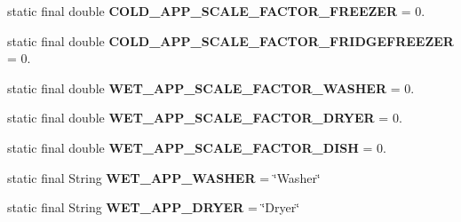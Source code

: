 \begin{DoxyCompactItemize}
\item 
\hypertarget{classuk_1_1ac_1_1dmu_1_1iesd_1_1cascade_1_1base_1_1_consts_a2bb906b11d1d16b15a14c3abafaad2d3}{static final double {\bfseries C\-O\-L\-D\-\_\-\-A\-P\-P\-\_\-\-S\-C\-A\-L\-E\-\_\-\-F\-A\-C\-T\-O\-R\-\_\-\-F\-R\-E\-E\-Z\-E\-R} = 0.}\label{classuk_1_1ac_1_1dmu_1_1iesd_1_1cascade_1_1base_1_1_consts_a2bb906b11d1d16b15a14c3abafaad2d3}

\item 
\hypertarget{classuk_1_1ac_1_1dmu_1_1iesd_1_1cascade_1_1base_1_1_consts_ade2308a57c0b69b32958f44af595b12e}{static final double {\bfseries C\-O\-L\-D\-\_\-\-A\-P\-P\-\_\-\-S\-C\-A\-L\-E\-\_\-\-F\-A\-C\-T\-O\-R\-\_\-\-F\-R\-I\-D\-G\-E\-F\-R\-E\-E\-Z\-E\-R} = 0.}\label{classuk_1_1ac_1_1dmu_1_1iesd_1_1cascade_1_1base_1_1_consts_ade2308a57c0b69b32958f44af595b12e}

\item 
\hypertarget{classuk_1_1ac_1_1dmu_1_1iesd_1_1cascade_1_1base_1_1_consts_ab7266028423e1640f6bd3a1f4e8ee32c}{static final double {\bfseries W\-E\-T\-\_\-\-A\-P\-P\-\_\-\-S\-C\-A\-L\-E\-\_\-\-F\-A\-C\-T\-O\-R\-\_\-\-W\-A\-S\-H\-E\-R} = 0.}\label{classuk_1_1ac_1_1dmu_1_1iesd_1_1cascade_1_1base_1_1_consts_ab7266028423e1640f6bd3a1f4e8ee32c}

\item 
\hypertarget{classuk_1_1ac_1_1dmu_1_1iesd_1_1cascade_1_1base_1_1_consts_af96acf98e4f14d95499e8324e988a65f}{static final double {\bfseries W\-E\-T\-\_\-\-A\-P\-P\-\_\-\-S\-C\-A\-L\-E\-\_\-\-F\-A\-C\-T\-O\-R\-\_\-\-D\-R\-Y\-E\-R} = 0.}\label{classuk_1_1ac_1_1dmu_1_1iesd_1_1cascade_1_1base_1_1_consts_af96acf98e4f14d95499e8324e988a65f}

\item 
\hypertarget{classuk_1_1ac_1_1dmu_1_1iesd_1_1cascade_1_1base_1_1_consts_a2281fcd337cf7514a4ed9578940acbfe}{static final double {\bfseries W\-E\-T\-\_\-\-A\-P\-P\-\_\-\-S\-C\-A\-L\-E\-\_\-\-F\-A\-C\-T\-O\-R\-\_\-\-D\-I\-S\-H} = 0.}\label{classuk_1_1ac_1_1dmu_1_1iesd_1_1cascade_1_1base_1_1_consts_a2281fcd337cf7514a4ed9578940acbfe}

\item 
\hypertarget{classuk_1_1ac_1_1dmu_1_1iesd_1_1cascade_1_1base_1_1_consts_a28569109e184fbb6bca37861d28d0969}{static final String {\bfseries W\-E\-T\-\_\-\-A\-P\-P\-\_\-\-W\-A\-S\-H\-E\-R} = \char`\"{}Washer\char`\"{}}\label{classuk_1_1ac_1_1dmu_1_1iesd_1_1cascade_1_1base_1_1_consts_a28569109e184fbb6bca37861d28d0969}

\item 
\hypertarget{classuk_1_1ac_1_1dmu_1_1iesd_1_1cascade_1_1base_1_1_consts_aa91530f1fdd7f1a919c881d713f2c9d2}{static final String {\bfseries W\-E\-T\-\_\-\-A\-P\-P\-\_\-\-D\-R\-Y\-E\-R} = \char`\"{}Dryer\char`\"{}}\label{classuk_1_1ac_1_1dmu_1_1iesd_1_1cascade_1_1base_1_1_consts_aa91530f1fdd7f1a919c881d713f2c9d2}


\end{DoxyCompactItemize}
